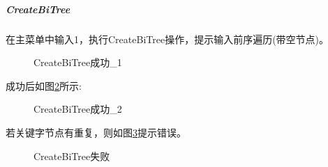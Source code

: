 \documentclass[supercite]{Experimental_Report}
\theoremstyle{definition}
\begin{document}
\subparagraph{CreateBiTree}
\noindent
在主菜单中输入1，执行CreateBiTree操作，提示输入前序遍历(带空节点)。
\begin{figure}[htbp]
	\centering
	\centering
	\caption{CreateBiTree成功\_1}
	\label{fig5-2}
\end{figure}

\noindent
成功后如图\ref{fig5-3}所示:
\begin{figure}[htbp]
	\centering
	\centering
	\caption{CreateBiTree成功\_2}
	\label{fig5-3}
\end{figure}

\noindent
若关键字节点有重复，则如图\ref{fig5-4}提示错误。
\begin{figure}[htbp]
	\centering
	\centering
	\caption{CreateBiTree失败}
	\label{fig5-4}
\end{figure}
\end{document}
